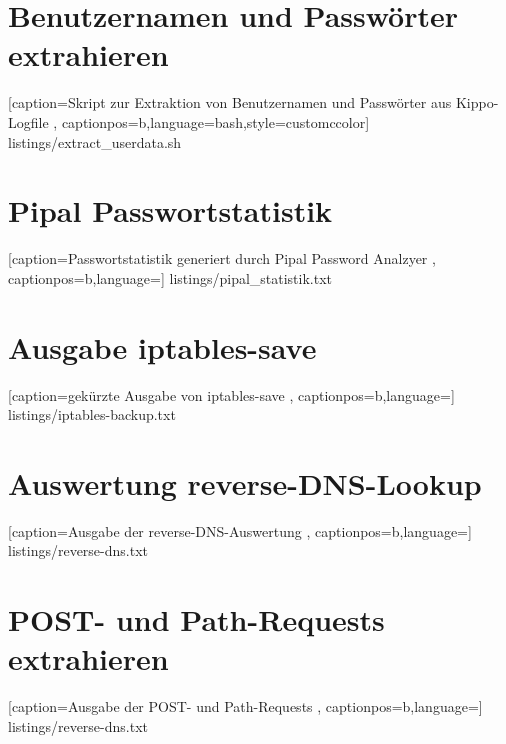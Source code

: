 \newpage

\section*{Benutzernamen und Passwörter extrahieren}
\label{app:Benutzernamen und Passwörter extrahieren}


    [caption={Skript zur Extraktion von Benutzernamen und Passwörter aus Kippo-Logfile}
       \label{lst:mitm_onmsg},
       captionpos=b,language=bash,style=customccolor]
 {listings/extract_userdata.sh}
 
 
\newpage
 
\section*{Pipal Passwortstatistik}
\label{app:Pipal Passwortstatistik}


    [caption={Passwortstatistik generiert durch Pipal Password Analzyer}
       \label{lst:mitm_onmsg},
       captionpos=b,language={}]
 {listings/pipal_statistik.txt}
 
 
\newpage 
 
\section*{Ausgabe iptables-save}
\label{app:Ausgabe iptables-save}


    [caption={gekürzte Ausgabe von iptables-save}
       \label{lst:mitm_onmsg},
       captionpos=b,language={}]
 {listings/iptables-backup.txt}
 

\newpage 
 
\section*{Auswertung reverse-DNS-Lookup}
\label{app:Auswertung reverse-DNS-Lookup}


    [caption={Ausgabe der reverse-DNS-Auswertung}
       \label{lst:reverse_dns},
       captionpos=b,language={}]
 {listings/reverse-dns.txt}
 
 
\newpage 
 
\section*{POST- und Path-Requests extrahieren}
\label{app:POST- und Path-Requests extrahieren}


    [caption={Ausgabe der POST- und Path-Requests}
       \label{lst:reverse_dns},
       captionpos=b,language={}]
 {listings/reverse-dns.txt} 
 